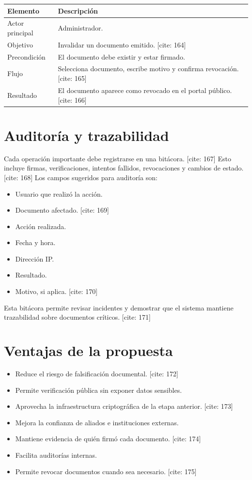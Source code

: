 \documentclass[10pt]{article} [cite: 1]
\begin{document}
\begin{longtable}{p{4cm}p{10cm}}
\toprule
\textbf{Elemento} & \textbf{Descripción} \\
\midrule
Actor principal & Administrador. \\
Objetivo & Invalidar un documento emitido. [cite: 164] \\
Precondición & El documento debe existir y estar firmado. \\
Flujo & Selecciona documento, escribe motivo y confirma revocación. [cite: 165] \\
Resultado & El documento aparece como revocado en el portal público. [cite: 166] \\
\bottomrule
\end{longtable}

\section{Auditoría y trazabilidad}

Cada operación importante debe registrarse en una bitácora. [cite: 167] Esto incluye firmas, verificaciones, intentos fallidos, revocaciones y cambios de estado. [cite: 168] Los campos sugeridos para auditoría son:

\begin{itemize}
    \item Usuario que realizó la acción.
    \item Documento afectado. [cite: 169]
    \item Acción realizada.
    \item Fecha y hora.
    \item Dirección IP.
    \item Resultado.
    \item Motivo, si aplica. [cite: 170]
\end{itemize}

Esta bitácora permite revisar incidentes y demostrar que el sistema mantiene trazabilidad sobre documentos críticos. [cite: 171]

\section{Ventajas de la propuesta}

\begin{itemize}
    \item Reduce el riesgo de falsificación documental. [cite: 172]
    \item Permite verificación pública sin exponer datos sensibles.
    \item Aprovecha la infraestructura criptográfica de la etapa anterior. [cite: 173]
    \item Mejora la confianza de aliados e instituciones externas.
    \item Mantiene evidencia de quién firmó cada documento. [cite: 174]
    \item Facilita auditorías internas.
    \item Permite revocar documentos cuando sea necesario. [cite: 175]
\end{itemize}
\end{document}
